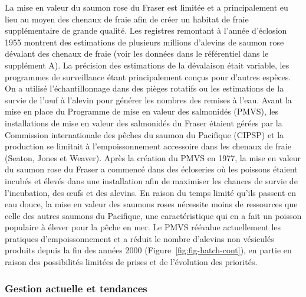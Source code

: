 \documentclass[french,11pt]{book}
\begin{document}
La mise en valeur du saumon rose du Fraser est limitée et a principalement eu lieu au moyen des chenaux de fraie afin de créer un habitat de fraie supplémentaire de grande qualité. Les registres remontant à l'année d'éclosion 1955 montrent des estimations de plusieurs millions d'alevins de saumon rose dévalant des chenaux de fraie (voir les données dans le référentiel dans le supplément A). La précision des estimations de la dévalaison était variable, les programmes de surveillance étant principalement conçus pour d'autres espèces. On a utilisé l'échantillonnage dans des pièges rotatifs ou les estimations de la survie de l'œuf à l'alevin pour générer les nombres des remises à l'eau. Avant la mise en place du Programme de mise en valeur des salmonidés (PMVS), les installations de mise en valeur des salmonidés du Fraser étaient gérées par la Commission internationale des pêches du saumon du Pacifique (CIPSP) et la production se limitait à l'empoissonnement accessoire dans les chenaux de fraie (Seaton, Jones et Weaver). Après la création du PMVS en 1977, la mise en valeur du saumon rose du Fraser a commencé dans des écloseries où les poissons étaient incubés et élevés dans une installation afin de maximiser les chances de survie de l'incubation, des œufs et des alevins. En raison du temps limité qu'ils passent en eau douce, la mise en valeur des saumons roses nécessite moins de ressources que celle des autres saumons du Pacifique, une caractéristique qui en a fait un poisson populaire à élever pour la pêche en mer. Le PMVS réévalue actuellement les pratiques d'empoissonnement et a réduit le nombre d'alevins non vésiculés produits depuis la fin des années 2000 (Figure~\ref{fig:fig-hatch-cont}), en partie en raison des possibilités limitées de prises et de l'évolution des priorités.

\hypertarget{gestion-actuelle-et-tendances}{%
\subsubsection{Gestion actuelle et tendances}\label{gestion-actuelle-et-tendances}}
\end{document}
